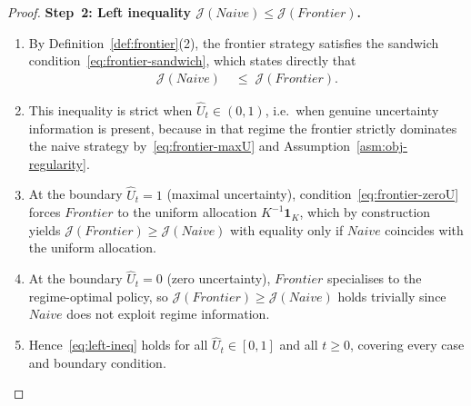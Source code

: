 \documentclass[12pt,openany]{book}
\numberwithin{equation}{chapter}
\theoremstyle{plain}
\theoremstyle{definition}
\theoremstyle{remark}
\numberwithin{equation}{chapter}
\theoremstyle{plain}
\newcommand{\Naive}{N}
\newcommand{\Frontier}{F}
\def\Naive{Naive}%
\def\Frontier{Frontier}%
\begin{document}
\begin{proof}
\medskip
\noindent\textbf{Step~2: Left inequality
$\mathcal{J}(\Naive) \leq \mathcal{J}(\Frontier)$.}
\begin{enumerate}
  \item By Definition~\ref{def:frontier}(2), the frontier
        strategy satisfies the sandwich
        condition~\eqref{eq:frontier-sandwich}, which
        states directly that
        \begin{align}
          \mathcal{J}(\Naive)
          &\;\leq\;
          \mathcal{J}(\Frontier).
          \label{eq:left-ineq}
        \end{align}
  \item This inequality is strict when
        $\hat{U}_t \in (0,1)$, i.e.\ when genuine
        uncertainty information is present, because in that
        regime the frontier strictly dominates the naive
        strategy by~\eqref{eq:frontier-maxU} and
        Assumption~\ref{asm:obj-regularity}.
  \item At the boundary $\hat{U}_t = 1$
        (maximal uncertainty), condition~\eqref{eq:frontier-zeroU}
        forces $\Frontier$ to the uniform allocation
        $K^{-1}\mathbf{1}_K$, which by construction
        yields $\mathcal{J}(\Frontier) \geq
        \mathcal{J}(\Naive)$ with equality only if
        $\Naive$ coincides with the uniform allocation.
  \item At the boundary $\hat{U}_t = 0$
        (zero uncertainty), $\Frontier$ specialises to the
        regime-optimal policy, so
        $\mathcal{J}(\Frontier) \geq \mathcal{J}(\Naive)$
        holds trivially since $\Naive$ does not exploit
        regime information.
  \item Hence~\eqref{eq:left-ineq} holds for all
        $\hat{U}_t \in [0,1]$ and all $t \geq 0$,
        covering every case and boundary condition.
\end{enumerate}


\end{proof}
\end{document}
